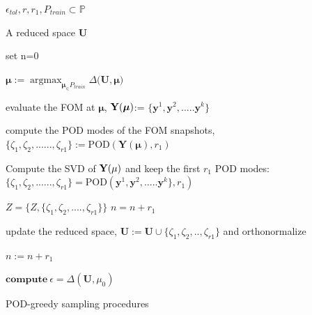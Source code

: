 \documentclass[]{interact}
\DeclareMathOperator{\argmaxH}{argmax}
\theoremstyle{plain}%
\theoremstyle{definition}
\theoremstyle{remark}
\begin{document}
\begin{algorithm}[H]
	
	\begin{algorithmic}
		
		\REQUIRE $\epsilon_{tol}, r, r_1, P_{train} \subset \mathbb P$ 
		
		\ENSURE A reduced space $\textbf{U}$
		
		\STATE set n=0 
		
		
		\STATE $\boldsymbol{\mu} := \argmaxH_{\boldsymbol{\mu}_\in P_{train}} \Delta(\textbf{U}, \boldsymbol{\mu)}$
		
		\STATE evaluate the FOM at $\boldsymbol{\mu}$, $\textbf Y(\boldsymbol{\mu})$:= $\{\textbf{y}^1, \textbf{y}^2, ..... \textbf{y}^k\}$ 
		
		\STATE compute the POD modes of the FOM snapshots, $\{\zeta_1, \zeta_2, ......,\zeta_{r1}\} := \text{POD}(\textbf{Y}(\boldsymbol{\mu}), r_1)$
		
		\STATE Compute the SVD of $\textbf Y(\mu)$ and keep the first $r_1$ POD modes:$\{\zeta_1, \zeta_2, ......,\zeta_{r1}\}= \text{POD}(\textbf{y}^1, \textbf{y}^2, ..... \textbf{y}^k\}, r_1) $
		
		\STATE $Z = \{Z, \{\zeta_1, \zeta_2, ....,\zeta_{r1}\}\}$  $n = n+r_1$
		
		\STATE update the reduced space, $\textbf{U} := \textbf{U} \cup \{\zeta_1, \zeta_2, ..,\zeta_{r1}\} $ and orthonormalize
		
		\STATE $n:=n+r_1$
		
		\STATE $ \textbf{compute} ~\epsilon = \Delta(\textbf{U}, \mu_0)$
		
		\ENDWHILE
		
	\end{algorithmic}
	
	\caption{POD-greedy sampling procedures}
	
	\label{alg:greedy pod}
	
\end{algorithm}
\end{document}
